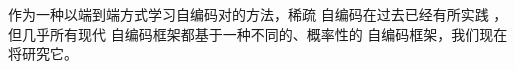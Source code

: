 \documentclass[../../book-main.tex]{subfiles}
\begin{document}
作为一种以端到端方式学习自编码对的方法，稀疏
自编码在过去已经有所实践
\cite{Ranzato2006-oq,10.5555/3042573.3042641}，但几乎所有现代
自编码框架都基于一种不同的、概率性的
自编码框架，我们现在将研究它。
\end{document}
